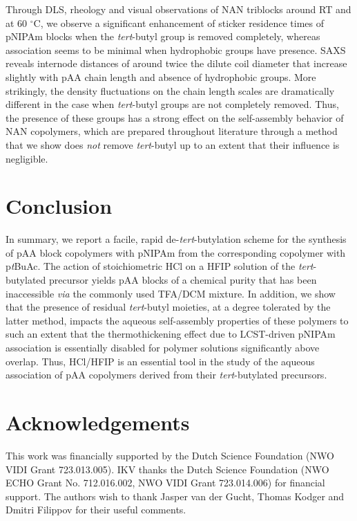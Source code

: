 \documentclass{article}
\begin{document}
Through DLS, rheology and visual observations of NAN triblocks around RT and at
60 $^\circ\mathrm{C}$, we observe a significant enhancement of sticker residence times 
of pNIPAm blocks 
when the \emph{tert}-butyl group is removed completely, whereas association seems to be minimal
when hydrophobic groups have presence. SAXS reveals internode distances of around twice the
dilute coil diameter that increase slightly with pAA chain length and absence of 
hydrophobic groups. More strikingly,
the density fluctuations on the chain length scales are dramatically different in the 
case when \emph{tert}-butyl groups are
not completely removed. Thus, the presence of these groups has a strong effect on the 
self-assembly behavior of NAN copolymers, 
which are prepared throughout literature through a method that we show does \emph{not} 
remove \emph{tert}-butyl up to an 
extent that their influence is negligible.

\section*{Conclusion}
In summary, we report a facile, rapid de-\emph{tert}-butylation scheme for the synthesis 
of pAA block copolymers 
with pNIPAm from the corresponding copolymer with p\emph{t}BuAc. The action of 
stoichiometric HCl on a HFIP solution
of the \emph{tert}-butylated precursor yields pAA blocks of a chemical purity that has been 
inaccessible \emph{via} the commonly used TFA/DCM mixture. In addition, we show that the 
presence of residual
\emph{tert}-butyl moieties, at a degree tolerated by the latter method, impacts the 
aqueous self-assembly properties 
of these polymers to such an extent that the thermothickening effect due to LCST-driven 
pNIPAm association is
essentially disabled for polymer solutions significantly above overlap. Thus, HCl/HFIP 
is an essential tool in the
study of the aqueous association of pAA copolymers derived from their \emph{tert}-butylated 
precursors.

\section*{Acknowledgements}
This work was financially supported by the Dutch Science Foundation (NWO VIDI Grant 723.013.005).
IKV thanks the Dutch Science Foundation (NWO ECHO Grant No. 712.016.002, NWO VIDI Grant 723.014.006) for
financial support. The authors wish to thank Jasper van der Gucht, Thomas Kodger and Dmitri Filippov
for their useful comments.

\end{document}

